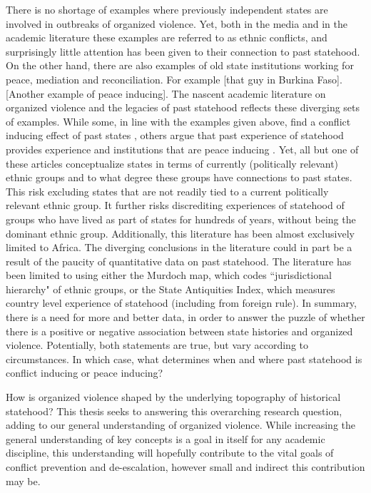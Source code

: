 \documentclass[12pt]{article}
\begin{document}
There is no shortage of examples where previously independent states are
involved in outbreaks of organized violence. Yet, both in the media and in the
academic literature these examples are referred to as ethnic conflicts, and
surprisingly little attention has been given to their connection to past
statehood. On the other hand, there are also examples of old state institutions
working for peace, mediation and reconciliation. For example [that guy in
Burkina Faso]. [Another example of peace inducing]. The nascent academic
literature on organized violence and the legacies of past statehood reflects
these diverging sets of examples. While some, in line with the examples given
above, find a conflict inducing effect of past states \citep{Englebert2002,
Paine2019}, others argue that past experience of statehood provides experience
and institutions that are peace inducing \citep{Wig2016, Wig2018,
Depetris-Chauvin2016}. Yet, all but one of these articles conceptualize states
in terms of currently (politically relevant) ethnic groups and to what degree
these groups have connections to past states. This risk excluding states that
are not readily tied to a current politically relevant ethnic group. It further
risks discrediting experiences of statehood of groups who have lived as part of
states for hundreds of years, without being the dominant ethnic group.
Additionally, this literature has been almost exclusively limited to Africa. The
diverging conclusions in the literature could in part be a result of the paucity
of quantitative data on past statehood. The literature has been limited to using
either the Murdoch map, which codes ``jurisdictional hierarchy" of ethnic
groups, or the State Antiquities Index, which measures country level experience
of statehood (including from foreign rule). In summary, there is a need for more
and better data, in order to answer the puzzle of whether there is a positive or
negative association between state histories and organized violence.
Potentially, both statements are true, but vary according to circumstances. In
which case, what determines when and where past statehood is conflict inducing
or peace inducing?


How is organized violence shaped by the underlying topography of historical
statehood? This thesis seeks to answering this overarching research question,
adding to our general understanding of organized violence. While increasing the
general understanding of key concepts is a goal in itself for any academic
discipline, this understanding will hopefully contribute to the vital goals of
conflict prevention and de-escalation, however small and indirect this
contribution may be.
\end{document}
